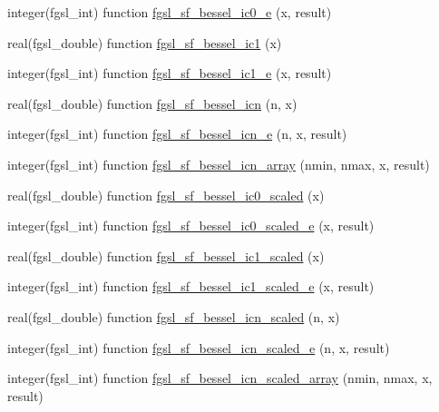 \begin{DoxyCompactItemize}
\item 
integer(fgsl\+\_\+int) function \hyperlink{specfunc_8finc_a7b8276504f35982296fdb8f0a73ac700}{fgsl\+\_\+sf\+\_\+bessel\+\_\+ic0\+\_\+e} (x, result)
\item 
real(fgsl\+\_\+double) function \hyperlink{specfunc_8finc_a57ca7afe78547adb6e6a8bc0ae3fe151}{fgsl\+\_\+sf\+\_\+bessel\+\_\+ic1} (x)
\item 
integer(fgsl\+\_\+int) function \hyperlink{specfunc_8finc_a1a560a42327064c9157aeb31a5f087b9}{fgsl\+\_\+sf\+\_\+bessel\+\_\+ic1\+\_\+e} (x, result)
\item 
real(fgsl\+\_\+double) function \hyperlink{specfunc_8finc_a73b3d7193eb8237855b8092ed6fb1320}{fgsl\+\_\+sf\+\_\+bessel\+\_\+icn} (n, x)
\item 
integer(fgsl\+\_\+int) function \hyperlink{specfunc_8finc_a9a54b8667a7e68a6c786c9c013e638fd}{fgsl\+\_\+sf\+\_\+bessel\+\_\+icn\+\_\+e} (n, x, result)
\item 
integer(fgsl\+\_\+int) function \hyperlink{specfunc_8finc_acc794c9ba7b396f80bd9ec1f3683e647}{fgsl\+\_\+sf\+\_\+bessel\+\_\+icn\+\_\+array} (nmin, nmax, x, result)
\item 
real(fgsl\+\_\+double) function \hyperlink{specfunc_8finc_a1ba45c364c2186f7f7c4104ea4cbec0a}{fgsl\+\_\+sf\+\_\+bessel\+\_\+ic0\+\_\+scaled} (x)
\item 
integer(fgsl\+\_\+int) function \hyperlink{specfunc_8finc_a61d95545cf0d5ed13f88048c83a102a1}{fgsl\+\_\+sf\+\_\+bessel\+\_\+ic0\+\_\+scaled\+\_\+e} (x, result)
\item 
real(fgsl\+\_\+double) function \hyperlink{specfunc_8finc_a1376d1f85a72eb89941dfa0bb5f83bf2}{fgsl\+\_\+sf\+\_\+bessel\+\_\+ic1\+\_\+scaled} (x)
\item 
integer(fgsl\+\_\+int) function \hyperlink{specfunc_8finc_a84b633483b90407d430234d42efd37ab}{fgsl\+\_\+sf\+\_\+bessel\+\_\+ic1\+\_\+scaled\+\_\+e} (x, result)
\item 
real(fgsl\+\_\+double) function \hyperlink{specfunc_8finc_a1796b471859cc00a3bc313795e954ab8}{fgsl\+\_\+sf\+\_\+bessel\+\_\+icn\+\_\+scaled} (n, x)
\item 
integer(fgsl\+\_\+int) function \hyperlink{specfunc_8finc_a3bee5c7f1b8bd64220882a37fe6222c1}{fgsl\+\_\+sf\+\_\+bessel\+\_\+icn\+\_\+scaled\+\_\+e} (n, x, result)
\item 
integer(fgsl\+\_\+int) function \hyperlink{specfunc_8finc_a2f95a0c0c77e1521ead5d98240f81cc0}{fgsl\+\_\+sf\+\_\+bessel\+\_\+icn\+\_\+scaled\+\_\+array} (nmin, nmax, x, result)
\item 

\end{DoxyCompactItemize}
